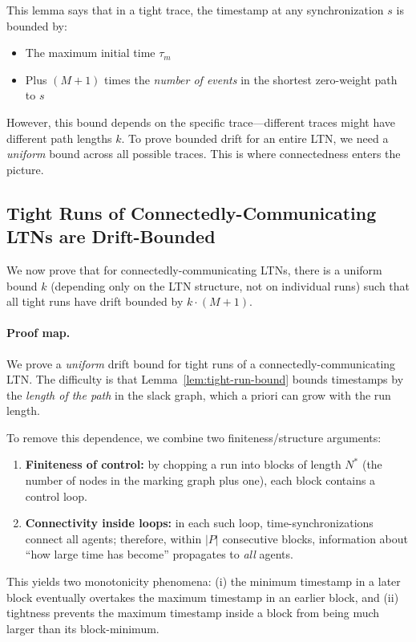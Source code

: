 This lemma says that in a tight trace, the timestamp at any synchronization $s$ is bounded by:
\begin{itemize}
\item The maximum initial time $\tau_m$
\item Plus $(M+1)$ times the \emph{number of events} in the shortest zero-weight path to $s$
\end{itemize}

However, this bound depends on the specific trace---different traces might have different path lengths $k$. To prove bounded drift for an entire LTN, we need a \emph{uniform} bound across all possible traces. This is where connectedness enters the picture.

\subsection{Tight Runs of Connectedly-Communicating LTNs are Drift-Bounded}
\label{sec:cc-ltn-bounded}

We now prove that for connectedly-communicating LTNs, there is a uniform bound $k$ (depending only on the LTN structure, not on individual runs) such that all tight runs have drift bounded by $k \cdot (M+1)$.

\paragraph*{Proof map.}
We prove a \emph{uniform} drift bound for tight runs of a connectedly-communicating LTN.
The difficulty is that Lemma~\ref{lem:tight-run-bound} bounds timestamps by the \emph{length of the path} in the slack graph, which a priori can grow with the run length.

To remove this dependence, we combine two finiteness/structure arguments:
\begin{enumerate}
    \item \textbf{Finiteness of control:} by chopping a run into blocks of length $N^*$ (the number of nodes in the marking graph plus one), each block contains a control loop.
    \item \textbf{Connectivity inside loops:} in each such loop, time-synchronizations connect all agents; therefore, within $|P|$ consecutive blocks, information about ``how large time has become'' propagates to \emph{all} agents.
\end{enumerate}
This yields two monotonicity phenomena:
(i) the minimum timestamp in a later block eventually overtakes the maximum timestamp in an earlier block, and
(ii) tightness prevents the maximum timestamp inside a block from being much larger than its block-minimum.

